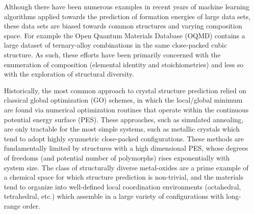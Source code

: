 %
%
Although there have been numerous examples in recent years of machine learning algorithms applied towards the prediction of formation energies of large  data sets,
these data sets are biased towards common structures and varying composition space.
%
For example the Open Quantum Materials Database (OQMD) contains a large dataset of ternary-alloy combinations in the same close-packed cubic structure.\cite{Kirklin2015}
%
As such, these efforts have been primarily concerned with the enumeration of composition (elemental identity and stoichiometries) and less so with the exploration of structural diversity.
%
%

%
Historically, the most common approach to crystal structure prediction relied on classical global optimization (GO) schemes,
in which the local/global minimum are found via numerical optimization routines that operate within the continuous potential energy surface (PES).  %
%
These approaches, such as simulated annealing, are only tractable for the most simple systems,
such as metallic crystals which tend to adopt highly symmetric close-packed configurations.%
%
These methods are fundamentally limited by structures with a high dimensional PES, whose degrees of freedoms (and potential number of polymorphs) rises exponentially with system size.\cite{Stillinger1999} The class of structurally diverse metal-oxides are a prime example of a chemical space for which structure prediction is non-trivial, and the materials tend to organize into well-defined local coordination environments (octahedral, tetrahedral, etc.) which assemble in a large variety of configurations with long-range order.



